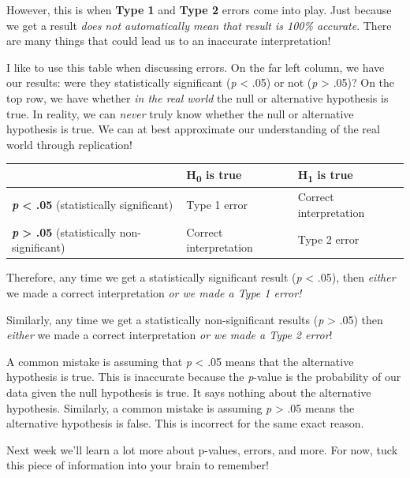 \documentclass[
]{book}
\begin{document}
However, this is when \textbf{Type 1} and \textbf{Type 2} errors come into play. Just because we get a result \emph{does not automatically mean that result is 100\% accurate}. There are many things that could lead us to an inaccurate interpretation!

I like to use this table when discussing errors. On the far left column, we have our results: were they statistically significant (\emph{p} \textless{} .05) or not (\emph{p} \textgreater{} .05)? On the top row, we have whether \emph{in the real world} the null or alternative hypothesis is true. In reality, we can \emph{never} truly know whether the null or alternative hypothesis is true. We can at best approximate our understanding of the real world through replication!

\begin{longtable}[]{@{}
  >{\raggedright\arraybackslash}p{}
  >{\raggedright\arraybackslash}p{}
  >{\raggedright\arraybackslash}p{}@{}}
\toprule
& H\textsubscript{0} is true & H\textsubscript{1} is true \\
\midrule
\endhead
\textbf{\emph{p}} \textbf{\textless{} .05} (statistically significant) & Type 1 error & Correct interpretation \\
\textbf{\emph{p}} \textbf{\textgreater{} .05} (statistically non-significant) & Correct interpretation & Type 2 error \\
\bottomrule
\end{longtable}

Therefore, any time we get a statistically significant result (\emph{p} \textless{} .05), then \emph{either} we made a correct interpretation \emph{or we made a Type 1 error!}

Similarly, any time we get a statistically non-significant results (\emph{p} \textgreater{} .05) then \emph{either} we made a correct interpretation \emph{or we made a Type 2 error}!

A common mistake is assuming that \emph{p} \textless{} .05 means that the alternative hypothesis is true. This is inaccurate because the \emph{p}-value is the probability of our data given the null hypothesis is true. It says nothing about the alternative hypothesis. Similarly, a common mistake is assuming \emph{p} \textgreater{} .05 means the alternative hypothesis is false. This is incorrect for the same exact reason.

Next week we'll learn a lot more about p-values, errors, and more. For now, tuck this piece of information into your brain to remember!
\end{document}
